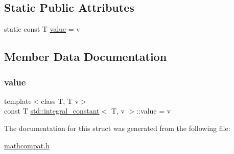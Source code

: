 \subsection*{Static Public Attributes}
\begin{DoxyCompactItemize}
\item 
static const T \hyperlink{structstd_1_1integral__constant_a6d745e58651b7700822f0fcd66e9dcfa}{value} = v
\end{DoxyCompactItemize}


\subsection{Member Data Documentation}
\mbox{\label{structstd_1_1integral__constant_a6d745e58651b7700822f0fcd66e9dcfa}} 
\subsubsection{\texorpdfstring{value}{value}}
{\footnotesize\ttfamily template$<$class T, T v$>$ \\
const T \hyperlink{structstd_1_1integral__constant}{std\+::integral\+\_\+constant}$<$ T, v $>$\+::value = v\hspace{0.3cm}{\ttfamily [static]}}



The documentation for this struct was generated from the following file\+:\begin{DoxyCompactItemize}
\item 
\hyperlink{mathcompat_8h}{mathcompat.\+h}\end{DoxyCompactItemize}
